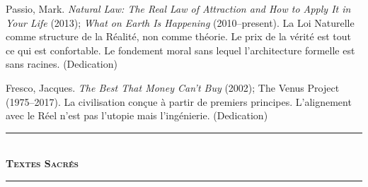 \documentclass[10pt, openany, oneside]{book}
\renewcommand{\normalsize}{\fontsize{10}{13}\selectfont}
\renewcommand{\footnotesize}{\fontsize{8.5}{11}\selectfont}
\begin{document}
{\footnotesize

\noindent Passio, Mark. \textit{Natural Law: The Real Law of Attraction and How to Apply It in Your Life} (2013); \textit{What on Earth Is Happening} (2010--present). La Loi Naturelle comme structure de la Réalité, non comme théorie. Le prix de la vérité est tout ce qui est confortable. Le fondement moral sans lequel l'architecture formelle est sans racines. (Dedication)

\vspace{0.3em}

\noindent Fresco, Jacques. \textit{The Best That Money Can't Buy} (2002); The Venus Project (1975--2017). La civilisation conçue à partir de premiers principes. L'alignement avec le Réel n'est pas l'utopie mais l'ingénierie. (Dedication)

}

\vspace{1.5em}

\begin{center}
    \rule{0.3\textwidth}{0.4pt}\\[0.5em]
    {\normalsize\bfseries\scshape Textes Sacrés}\\[0.3em]
    \rule{0.3\textwidth}{0.4pt}
\end{center}

\vspace{1em}
\end{document}
